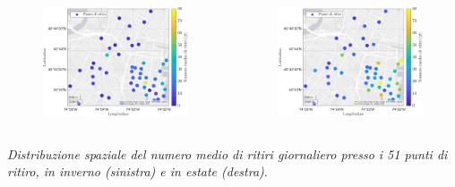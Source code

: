 \begin{frame}
	\centering
	\begin{columns}[T]
		\begin{column}[t]{0.48\linewidth}
			\centering
			\begin{figure}
				\includegraphics[width=\textwidth]{../Tesi/Immagini/4. Caso di studio/Mappe/Mappa ritiri, inverno}
			\end{figure}
		\end{column}
		\begin{column}[t]{0.48\linewidth}
			\centering
			\begin{figure}
				\includegraphics[width=\textwidth]{../Tesi/Immagini/4. Caso di studio/Mappe/Mappa ritiri, estate}
			\end{figure}
		\end{column}
	\end{columns}
	\vspace{5pt}
	\textit{Distribuzione spaziale del numero medio di ritiri giornaliero presso i 51 punti di ritiro, in inverno (sinistra) e in estate (destra)}.
\end{frame}

